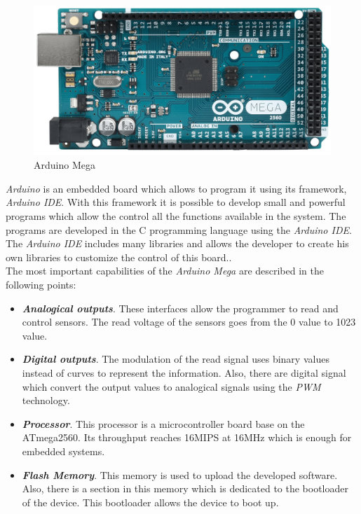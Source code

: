 \begin{figure}[H]
\begin{centering}
\includegraphics[scale=0.08]{IMGS/ARDUINO_MEGA.png}
\caption{Arduino Mega \label{Arduino_Mega}}
\end{centering}
\end{figure}

\textit{Arduino} is an embedded board which allows to program it using its framework, \textit{Arduino IDE}. With this framework it is possible to develop small and powerful programs which allow the control all the functions available in the system. The programs are developed in the C programming language using the \textit{Arduino IDE}. The \textit{Arduino IDE} includes many libraries and allows the developer to create his own libraries to customize the control of this board..\\

The most important capabilities of the \textit{Arduino Mega} are described in the following points:

\begin{itemize}

\item \textbf{\textit{Analogical outputs}}. These interfaces allow the programmer to read and control sensors. The read voltage of the sensors goes from the 0 value to 1023 value.

\item \textbf{\textit{Digital outputs}}. The modulation of the read signal uses binary values instead of curves to represent the information. Also, there are digital signal which convert the output values to analogical signals using the \textit{PWM} technology.

\item \textbf{\textit{Processor}}. This processor is a microcontroller board base on the ATmega2560. Its throughput reaches 16MIPS at 16MHz which is enough for embedded systems.

\item \textbf{\textit{Flash Memory}}. This memory is used to upload the developed software. Also, there is a section in this memory which is dedicated to the bootloader of the device. This bootloader allows the device to boot up.

\end{itemize}

